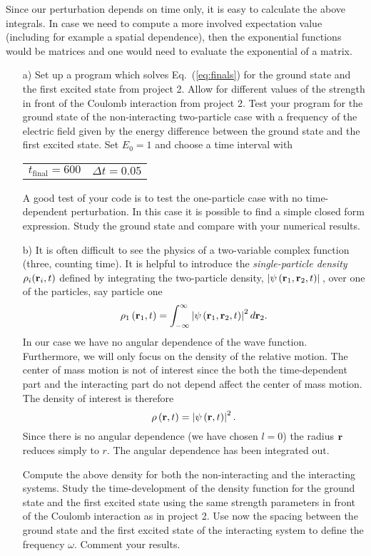 \documentclass[10pt]{revtex4}
\begin{document}
Since our perturbation depends on time only, it is easy to calculate the above integrals. In case we need to compute a more involved expectation value (including for example a spatial dependence), 
then the exponential functions would be matrices and one would need to 
evaluate the exponential of a matrix. 
\begin{enumerate}
\item[a)]  Set up a program which solves Eq.~(\ref{eq:finals}) for the ground state and the first excited state from project 2. Allow for different values 
of the strength in front of the Coulomb interaction from project 2.
Test your program for the ground state of the non-interacting two-particle case with a frequency of the electric field given by the energy 
difference between the ground state and the first excited state. Set
$E_0=1$ and  choose a time interval with
\begin{center}
  \begin{tabular}{ l l}
  	$t_{\mathrm{final}}=600$ & $\Delta t = 0.05$ \\
  \end{tabular}    
\end{center}
A good test of your code is to test the one-particle case with 
no time-dependent perturbation. In this case it is possible to find a simple
closed form expression. Study the ground state and compare with your numerical
results.
\item[b)] It is often difficult to see the physics of a two-variable complex function (three, counting time). It is helpful to introduce the \emph{single-particle density} $\rho_i ({\bf r}_i,t)$ defined by integrating the two-particle density, $\left|\psi \left({\bf r}_1,{\bf r}_2,t\right)\right|\,$, over one of the particles, say particle one
\begin{equation}
\rho_1 \left( {\bf r}_1,t \right) = \int ^{\infty}_{-\infty} \left|\psi \left({\bf r}_1,{\bf r}_2,t\right)\right|^2 d{\bf r}_2.
\end{equation}
In our case we have no angular dependence of the wave function. 
Furthermore, we will only focus on the  density of the relative motion. The center of mass
motion is not of interest since the both the time-dependent part and the interacting part
do not depend affect the center of mass motion.
The density  of interest is therefore 
\begin{equation}
\rho\left( {\bf r},t \right) = \left|\psi \left({\bf r},t\right)\right|^2.
\end{equation}
Since there is no angular dependence (we have chosen $l=0$)
the radius ${\bf r}$ reduces simply to $r$. The angular dependence has been integrated out. 

Compute the above density for both the non-interacting
and the interacting systems.
Study the time-development of the density function for the ground state and
the first excited state using the same strength parameters in front of the
Coulomb interaction as in project 2. Use now the spacing between the ground state and the first excited state of the interacting system to define
the frequency $\omega$. Comment your results.  


\end{enumerate}
\end{document}
